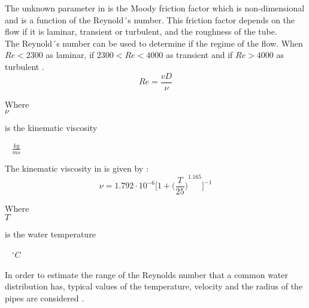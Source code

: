  The unknown parameter in  is the Moody friction factor 
 which is non-dimensional and is a function of the Reynold´s number. This friction factor depends on the flow if it is laminar, transient or turbulent, and the roughness of the tube. \\
 
 
The Reynold´s number can be used to determine if the regime of the flow. When $Re<2300$ as laminar, if $2300<Re<4000$ as transient and if
$Re>4000$ as turbulent \cite{Intro_Fluid}. 
\begin{equation}
   Re = \frac{vD}{\nu}
   \label{Reynolds}
 \end{equation}
 
  \begin{minipage}[t]{0.20\textwidth}
Where\\
\hspace*{8mm} $\nu$ 
\end{minipage}
\begin{minipage}[t]{0.68\textwidth}
\vspace*{2mm}
is the kinematic viscosity

\end{minipage}
\begin{minipage}[t]{0.10\textwidth}
\vspace*{2mm}
\textcolor{White}{te}$\unit{\frac{kg}{ms}}$
\end{minipage}

The kinematic viscosity in \cite{Design_Water} is given by :
\begin{equation}
  \nu = 1.792 \cdot 10^{-6} \bigg[1+{\bigg(\frac{T}{25}\bigg)}^{1.165} \bigg]^{-1}
\end{equation}

  \begin{minipage}[t]{0.20\textwidth}
Where\\
\hspace*{8mm} $T$ 
\end{minipage}
\begin{minipage}[t]{0.68\textwidth}
\vspace*{2mm}
is the water temperature  
 \end{minipage}
\begin{minipage}[t]{0.10\textwidth}
\vspace*{2mm}
\textcolor{White}{te}$\unit{^{\circ} C}$
\end{minipage}

In order to estimate the range of the Reynolds number that a common water 
distribution has, typical values of the temperature, velocity and the radius of 
the pipes are considered \cite{Urban_Design}. 

